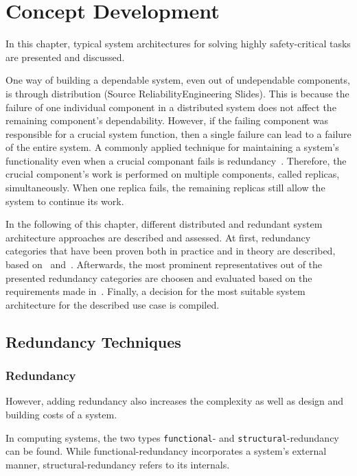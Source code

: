\chapter{Concept Development}

\iffalse

In this chapter, typical system architectures for solving highly safety-critical tasks are presented and discussed.

One way of building a dependable system, even out of undependable components, is through distribution (Source ReliabilityEngineering Slides).
This is because the failure of one individual component in a distributed system does not affect the remaining component's dependability.
However, if the failing component was responsible for a crucial system function, then a single failure can lead to a failure of the entire system.
A commonly applied technique for maintaining a system's functionality even when a crucial componant fails is redundancy~\cite{TanenbaumSteen07}.
Therefore, the crucial component's work is performed on multiple components, called replicas, simultaneously.
When one replica fails, the remaining replicas still allow the system to continue its work.

In the following of this chapter, different distributed and redundant system architecture approaches are described and assessed.
At first, redundancy categories that have been proven both in practice and in theory are described, based on~\cite{GeffroyMotetDependableComputing} and~\cite{BarryFaultToleranceAnalysis}.
Afterwards, the most prominent representatives out of the presented redundancy categories are choosen and evaluated based on the requirements made in~.
Finally, a decision for the most suitable system architecture for the described use case is compiled.

\section{Redundancy Techniques}


\subsection{Redundancy}

However, adding redundancy also increases the complexity as well as design and building costs of a system.

In computing systems, the two types \texttt{functional}- and \texttt{structural}-redundancy can be found.
While functional-redundancy incorporates a system's external manner, structural-redundancy refers to its internals.

